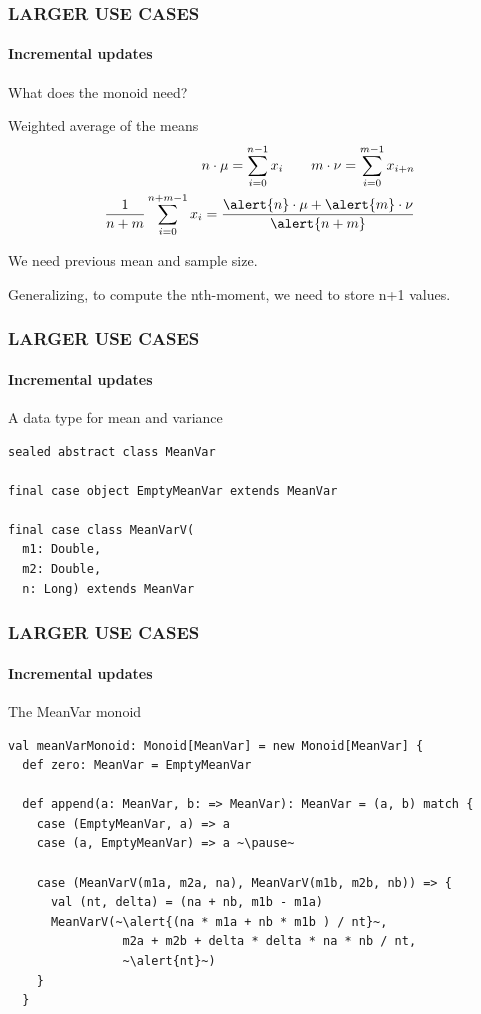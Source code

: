 \documentclass{beamer}
\begin{document}
\begin{frame} \frametitle{LARGER USE CASES}
  \framesubtitle{Incremental updates}
  What does the monoid need?
  \begin{block}{Weighted average of the means}
    \[
    \begin{split}
      n\cdot \mu = \sum_{i=0}^{n-1} x_i \qquad  m\cdot \nu = \sum_{i=0}^{m-1} x_{i+n} \\
      \frac{1}{n+m} \sum_{i=0}^{n+m-1} x_i = \frac{\alert{n}\cdot\mu + \alert{m}\cdot\nu} {\alert{n+m}}
    \end{split}
    \]
  \end{block}

  We need previous \alert{mean} and \alert{sample size.}

  Generalizing, to compute the nth-moment, we need to store n+1 values.
\end{frame}

\begin{frame}[fragile] \frametitle{LARGER USE CASES}
  \framesubtitle{Incremental updates}
  \begin{block}{A data type for mean and variance}
  \begin{lstlisting}
sealed abstract class MeanVar

final case object EmptyMeanVar extends MeanVar

final case class MeanVarV(
  m1: Double,
  m2: Double,
  n: Long) extends MeanVar
  \end{lstlisting}
  \end{block}
\end{frame}

\begin{frame}[fragile] \frametitle{LARGER USE CASES}
  \framesubtitle{Incremental updates}
  \begin{block}{The MeanVar monoid}
  \begin{lstlisting}
val meanVarMonoid: Monoid[MeanVar] = new Monoid[MeanVar] {
  def zero: MeanVar = EmptyMeanVar

  def append(a: MeanVar, b: => MeanVar): MeanVar = (a, b) match {
    case (EmptyMeanVar, a) => a
    case (a, EmptyMeanVar) => a ~\pause~

    case (MeanVarV(m1a, m2a, na), MeanVarV(m1b, m2b, nb)) => {
      val (nt, delta) = (na + nb, m1b - m1a)
      MeanVarV(~\alert{(na * m1a + nb * m1b ) / nt}~,
                m2a + m2b + delta * delta * na * nb / nt,
                ~\alert{nt}~)
    }
  }
  \end{lstlisting}
  \end{block}
\end{frame}
\end{document}
